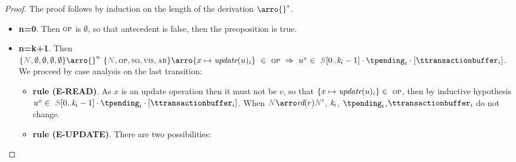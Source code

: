 \documentclass[envcountsect,runningheads,orivec]{llncs}
\begin{document}
\begin{proof} The proof follows by induction on the length of the derivation $\arro{} ^*$.
\begin{itemize}
   \item{\bf n=0}. Then $\textsc{\scriptsize{OP}}$ is $\emptyset$, so that antecedent is false, then the preoposition is true.
   \item{\bf n=k+1}. Then $\environment{\systemterm}{\emptyset}{\emptyset}{\emptyset}{\emptyset} \arro{} ^n\ \environment{\systemterm}{\op}{\so}{\vis}{\arb} \arroi{} \{x \mapsto \updatebyclient{i} \}\ \in \ \op\ \Rightarrow\ u^x \in\  \queuemessage[0..\tknown_i-1] \cdot \tpending_i \cdot [\ttransactionbuffer_i]$. We proceed by 
case analysis on the last transition:
	
	\begin{itemize}
        \item {\bf rule (\textsc{E-READ})}. As $x$ is an update operation then it must not be $v$, so that $\{x \mapsto \textit{update}(u)_i \} \in\ \textsc{\scriptsize{OP}}$, then by inductive hypothesis $u^x \in\  \queuemessage[0..\tknown_i-1] \cdot \tpending_i \cdot [\ttransactionbuffer_i]$. When $\systemterm \arroi{\readtran{r}} \systemterm'$, $\textit{k}_i$, $\tpending_i$,$\ttransactionbuffer_i$ do not change.
				\item {\bf rule (\textsc{E-UPDATE})}. There are two possibilities:
				

\end{itemize}
\end{itemize}
\end{proof}
\end{document}
